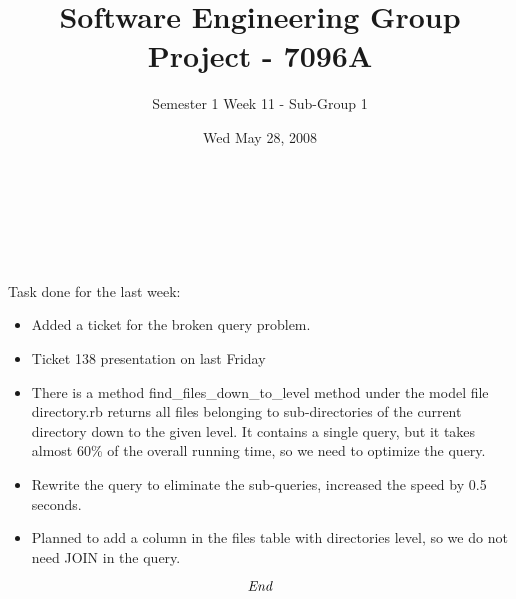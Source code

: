 \documentclass[10pt, a4]{article}
\begin{document}
 
\title{Software Engineering Group Project - 7096A}
\author{Semester 1 Week 11 - Sub-Group 1}
\date{Wed May 28, 2008}

\maketitle 

\\
 
\paragraph{}

\\

\paragraph{}

Task done for the last week:
\begin{itemize}
\item Added a ticket for the broken query problem.
\item Ticket 138 presentation on last Friday
\item There is a method find\_files\_down\_to\_level method under the model file directory.rb returns all 
files belonging to sub-directories of the current directory down to the given level. It contains a single 
query, but it takes almost 60\% of the overall running time, so we need to optimize the query.
\item Rewrite the query to eliminate the sub-queries, increased the speed by 0.5 seconds.
\item Planned to add a column in the files table with directories level, so we do not need JOIN in the query.
\end{itemize}

\[\emph{End}\]
 
\end{document}

